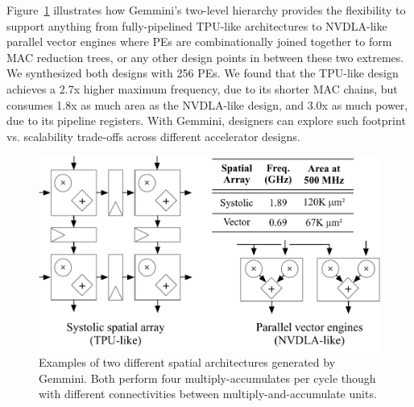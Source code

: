 Figure~\ref{fig:nvdla-vs-tpu-comparison} illustrates how Gemmini's two-level hierarchy provides the flexibility to support anything from fully-pipelined TPU-like architectures to NVDLA-like parallel vector engines where PEs are combinationally joined together to form MAC reduction trees, or any other design points in between these two extremes. We synthesized both designs with 256 PEs. We found that the TPU-like design achieves a 2.7x higher maximum frequency, due to its shorter MAC chains, but consumes 1.8x as much area as the NVDLA-like design, and 3.0x as much power, due to its pipeline registers. With Gemmini, designers can explore such footprint vs. scalability trade-offs across different accelerator designs.

\begin{figure}[t]
\centering
\includegraphics[width=\linewidth]{fig/Systolic-vs-NVDLA-smaller2.pdf}
\vspace{-0.2in}
\caption{Examples of two different spatial architectures generated by Gemmini. Both perform four multiply-accumulates per cycle though with different connectivities between multiply-and-accumulate units.}
\label{fig:nvdla-vs-tpu-comparison}
\vspace{-0.2in}
\end{figure}



